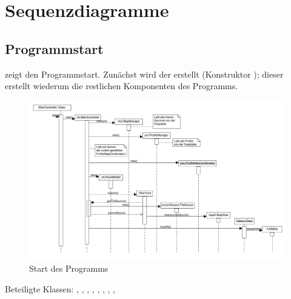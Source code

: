 \documentclass[a4paper, 11pt]{article}
\begin{document}
\section{Sequenzdiagramme}

\subsection{Programmstart}
 zeigt den Programmstart.
\def\currentclass{__BOGUS__} %
Zunächst wird der  erstellt (Konstruktor );
dieser erstellt wiederum die restlichen Komponenten des Programms.
\begin{figure}[H]
\centering
\includegraphics[angle=90, width=\textwidth]{StartSequenz}
\caption{Start des Programms}
\label{fig:sequenz_start}
\end{figure}
Beteiligte Klassen: , , , , , , , , 
\end{document}
